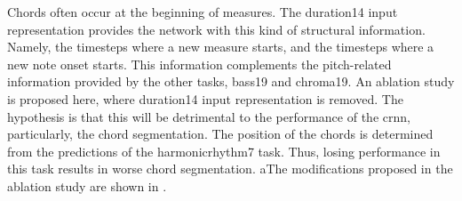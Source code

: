 
Chords often occur at the beginning of measures. The
\gls{duration14} input representation provides the network
with this kind of structural information. Namely, the
timesteps where a new measure starts, and the timesteps
where a new note onset starts. This information complements
the pitch-related information provided by the other tasks,
\gls{bass19} and \gls{chroma19}. An ablation study is
proposed here, where \gls{duration14} input representation
is removed. The hypothesis is that this will be detrimental
to the performance of the \gls{crnn}, particularly, the
chord segmentation. The position of the chords is determined
from the predictions of the \gls{harmonicrhythm7} task.
Thus, losing performance in this task results in worse chord
segmentation. aThe modifications proposed in the ablation
study are shown in .

